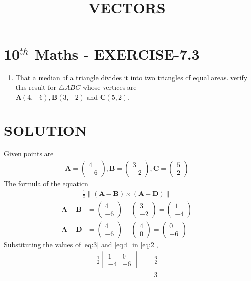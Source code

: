 \documentclass[12pt]{article}
\newcommand{\mydet}[1]{\ensuremath{\begin{vmatrix}#1\end{vmatrix}}}
\providecommand{\brak}[1]{\ensuremath{\left(#1\right)}}
\newcommand{\myvec}[1]{\ensuremath{\begin{pmatrix}#1\end{pmatrix}}}
\providecommand{\norm}[1]{\left\lVert#1\right\rVert}
\let\vec\mathbf
\begin{document}
\begin{center}
\title{\textbf{VECTORS}}
\date{\vspace{-5ex}} %
\maketitle
\end{center}

\section{10$^{th}$ Maths - EXERCISE-7.3}

\begin{enumerate}
\item That a median of a triangle divides it into two triangles  of equal areas. verify this result for $\triangle ABC$ whose vertices are $\vec{A}(4,-6),\vec{B}(3,-2)\text{ and }\vec{C}(5,2)$.
\end{enumerate}

\section{SOLUTION}
Given points are
\begin{align}
\vec{A}=\myvec{4\\ -6} ,
\vec{B}=\myvec{3\\ -2} ,
\vec{C}=\myvec{5\\ 2}
\end{align}
The formula of the equation
 \begin{align}
  \frac{1}{2} \norm{\brak{\vec{A}-\vec{B}}  \times 
   \brak{\vec{A}- \vec{D}}} \label{eq:2} 
\end{align}
\begin{align}
	\vec{A}- \vec{B} &= \myvec{4\\ -6}-\myvec{3\\ -2}=\myvec{1\\ -4}\label{eq:3}\\
	  \vec{A}- \vec{D} &= \myvec{4\\ -6}-\myvec{4\\ 0}=\myvec{0\\ -6}\label{eq:4}
  \end{align}
Substituting the values of \eqref{eq:3} and \eqref{eq:4} in \eqref{eq:2},
\begin{align}
	\frac{1}{2}\mydet{1 & 0\\-4 & -6}  
	&=	\frac{6}{2}\\
	&=3
\end{align}
\end{document}
